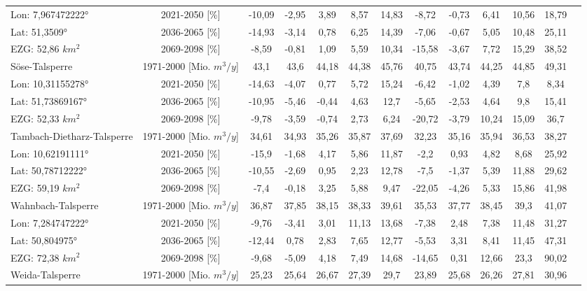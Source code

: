\begin{longtable}{@{\extracolsep{\fill}}lc|ccccc||cccccc}
\cline{2-13} 
Lon: 7,967472222° & 2021-2050 [\%]  & -10,09 & -2,95 & 3,89 & 8,57 & 14,83 & -8,72 & -0,73 & 6,41 & 10,56 & 18,79 & \\ 
Lat: 51,3509° & 2036-2065 [\%]  & -14,93 & -3,14 & 0,78 & 6,25 & 14,39 & -7,06 & -0,67 & 5,05 & 10,48 & 25,11 & \\ 
EZG: 52,86 $km^2$ & 2069-2098 [\%]  & -8,59 & -0,81 & 1,09 & 5,59 & 10,34 & -15,58 & -3,67 & 7,72 & 15,29 & 38,52 & \\ 
\hline 
Söse-Talsperre & 1971-2000 [Mio. $m^3/y$]  & 43,1 & 43,6 & 44,18 & 44,38 & 45,76 & 40,75 & 43,74 & 44,25 & 44,85 & 49,31 & \\ 
\cline{2-13} 
Lon: 10,31155278° & 2021-2050 [\%]  & -14,63 & -4,07 & 0,77 & 5,72 & 15,24 & -6,42 & -1,02 & 4,39 & 7,8 & 8,34 & \\ 
Lat: 51,73869167° & 2036-2065 [\%]  & -10,95 & -5,46 & -0,44 & 4,63 & 12,7 & -5,65 & -2,53 & 4,64 & 9,8 & 15,41 & \\ 
EZG: 52,33 $km^2$ & 2069-2098 [\%]  & -9,78 & -3,59 & -0,74 & 2,73 & 6,24 & -20,72 & -3,79 & 10,24 & 15,09 & 36,7 & \\ 
\hline 
Tambach-Dietharz-Talsperre & 1971-2000 [Mio. $m^3/y$]  & 34,61 & 34,93 & 35,26 & 35,87 & 37,69 & 32,23 & 35,16 & 35,94 & 36,53 & 38,27 & \\ 
\cline{2-13} 
Lon: 10,62191111° & 2021-2050 [\%]  & -15,9 & -1,68 & 4,17 & 5,86 & 11,87 & -2,2 & 0,93 & 4,82 & 8,68 & 25,92 & \\ 
Lat: 50,78712222° & 2036-2065 [\%]  & -10,55 & -2,69 & 0,95 & 2,23 & 12,78 & -7,5 & -1,37 & 5,39 & 11,88 & 29,62 & \\ 
EZG: 59,19 $km^2$ & 2069-2098 [\%]  & -7,4 & -0,18 & 3,25 & 5,88 & 9,47 & -22,05 & -4,26 & 5,33 & 15,86 & 41,98 & \\ 
\hline 
Wahnbach-Talsperre & 1971-2000 [Mio. $m^3/y$]  & 36,87 & 37,85 & 38,15 & 38,33 & 39,61 & 35,53 & 37,77 & 38,45 & 39,3 & 41,07 & \\ 
\cline{2-13} 
Lon: 7,284747222° & 2021-2050 [\%]  & -9,76 & -3,41 & 3,01 & 11,13 & 13,68 & -7,38 & 2,48 & 7,38 & 11,48 & 31,27 & \\ 
Lat: 50,804975° & 2036-2065 [\%]  & -12,44 & 0,78 & 2,83 & 7,65 & 12,77 & -5,53 & 3,31 & 8,41 & 11,45 & 47,31 & \\ 
EZG: 72,38 $km^2$ & 2069-2098 [\%]  & -9,68 & -5,09 & 4,18 & 7,49 & 14,68 & -14,65 & 0,31 & 12,66 & 23,3 & 90,02 & \\ 
\hline 
Weida-Talsperre & 1971-2000 [Mio. $m^3/y$]  & 25,23 & 25,64 & 26,67 & 27,39 & 29,7 & 23,89 & 25,68 & 26,26 & 27,81 & 30,96 & \\ 

\end{longtable}
